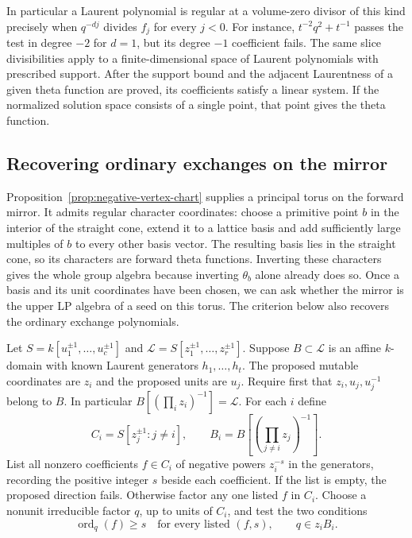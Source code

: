 \documentclass[11pt,reqno]{amsart}
\numberwithin{equation}{section}
\theoremstyle{definition}
\theoremstyle{remark}
\begin{document}
In particular a Laurent polynomial is regular at a volume-zero
divisor of this kind precisely when \(q^{-dj}\) divides \(f_j\) for
every \(j<0\). For instance, \(t^{-2}q^2+t^{-1}\) passes the test
in degree \(-2\) for \(d=1\), but its degree \(-1\) coefficient fails.
The same slice divisibilities apply to a finite-dimensional space of
Laurent polynomials with prescribed support. After the support bound
and the adjacent Laurentness of a given theta function are proved,
its coefficients satisfy a linear system. If the normalized solution
space consists of a single point, that point gives the theta function.

\subsection{Recovering ordinary exchanges on the mirror}

Proposition~\ref{prop:negative-vertex-chart} supplies a principal
torus on the forward mirror. It admits regular character coordinates:
choose a primitive point \(b\) in the interior of the straight cone,
extend it to a lattice basis and add sufficiently large multiples
of \(b\) to every other basis vector. The resulting basis lies in the
straight cone, so its characters are forward theta functions.
Inverting these characters gives the whole group algebra because
inverting \(\theta_b\) alone already does so. Once a basis and its unit coordinates have been chosen, we can ask
whether the mirror is the upper LP algebra of a seed on this torus.
The criterion below also recovers the ordinary exchange polynomials.

Let \(S=k[u_1^{\pm1},\ldots,u_c^{\pm1}]\) and
\(\mathcal L=S[z_1^{\pm1},\ldots,z_r^{\pm1}]\). Suppose \(B\subset \mathcal L\) is an
affine \(k\)-domain with known Laurent generators
\(h_1,\ldots,h_t\). The proposed mutable coordinates are \(z_i\) and
the proposed units are \(u_j\). Require first that \(z_i,u_j,u_j^{-1}\)
belong to \(B\). In particular \(B[(\prod_i z_i)^{-1}]=\mathcal L\).
For each \(i\) define
\[ C_i=S[z_j^{\pm1}:j\ne i],\qquad B_i=B[(\prod_{j\ne i}z_j)^{-1}]. \]
List all nonzero coefficients \(f\in C_i\) of
negative powers \(z_i^{-s}\) in the generators, recording the
positive integer \(s\) beside each coefficient. If the list is empty,
the proposed direction fails. Otherwise factor any one listed \(f\)
in \(C_i\). Choose a nonunit irreducible factor \(q\), up to units of
\(C_i\), and test the two conditions
\[ \operatorname{ord}_q(f)\ge s\quad\text{for every listed }(f,s), \qquad q\in z_iB_i . \]
\end{document}
